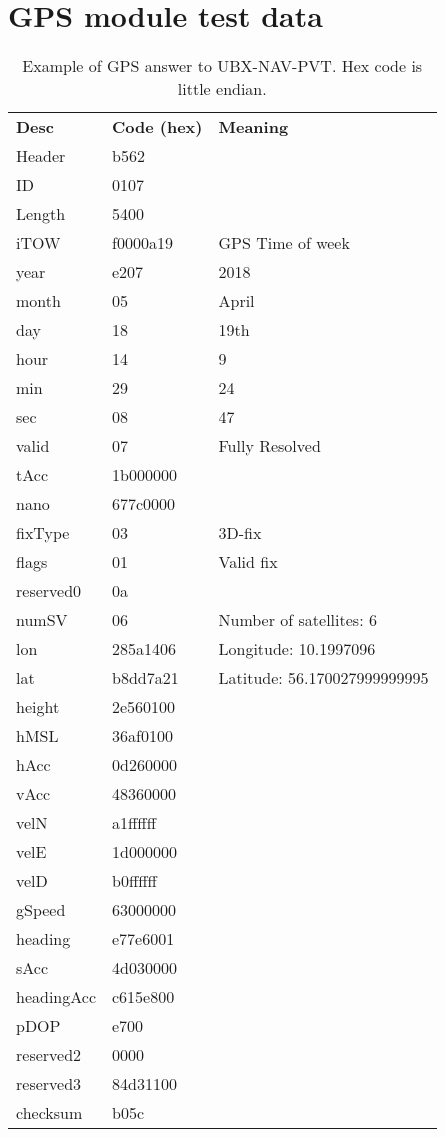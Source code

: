 \chapter{GPS module test data}
\label{app:GPSmodtest}
\begin{table}[H]
	\centering
	\setlength{\extrarowheight}{0pt}
	\begin{tabularx}{0.8\textwidth}{p{2cm} p{2cm} X}
		\oldtoprule
		\textbf{Desc} & \textbf{Code (hex)} & \textbf{Meaning} \\
		\oldmidrule
		Header & b562 & \\
		ID & 0107 & \\
		Length & 5400 & \\
		iTOW & f0000a19 & GPS Time of week \\
		year & e207 & 2018 \\
		month & 05 & April \\
		day & 18 & 19th \\
		hour & 14 & 9 \\
		min & 29 & 24 \\
		sec & 08 & 47 \\
		valid & 07 & Fully Resolved \\
		tAcc & 1b000000 & \\
		nano & 677c0000 & \\
		fixType & 03 & 3D-fix \\
		flags & 01 & Valid fix \\
		reserved0 & 0a & \\
		numSV & 06 & Number of satellites: 6 \\
		lon & 285a1406 & Longitude: \num{10.1997096} \\
		lat & b8dd7a21 & Latitude: \num{56.170027999999995} \\
		height & 2e560100 & \\
		hMSL & 36af0100 & \\
		hAcc & 0d260000 & \\
		vAcc & 48360000 & \\
		velN & a1ffffff & \\
		velE & 1d000000 & \\
		velD & b0ffffff & \\
		gSpeed & 63000000 & \\
		heading & e77e6001 & \\
		sAcc & 4d030000 & \\
		headingAcc & c615e800 & \\
		pDOP & e700 & \\
		reserved2 & 0000 & \\
		reserved3 & 84d31100 & \\
		checksum & b05c & \\
		\bottomrule
	\end{tabularx}
	\caption{Example of GPS answer to UBX-NAV-PVT\cite[p.~160-161]{NEO7_proto}. Hex code is little endian.}
	\label{tab:GPSmoddata}
\end{table}


